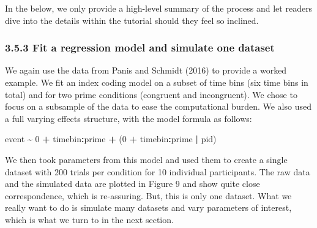 \documentclass[
  man, donotrepeattitle,floatsintext]{apa6}
\newenvironment{Shaded}{\begin{snugshade}}{\end{snugshade}}
\newcommand{\DecValTok}[1]{\textcolor[rgb]{0.00,0.00,0.81}{#1}}
\newcommand{\NormalTok}[1]{#1}
\newcommand{\SpecialCharTok}[1]{\textcolor[rgb]{0.81,0.36,0.00}{\textbf{#1}}}
\begin{document}
In the below, we only provide a high-level summary of the process and let readers dive into the details within the tutorial should they feel so inclined.

\subsubsection{3.5.3 Fit a regression model and simulate one dataset}\label{fit-a-regression-model-and-simulate-one-dataset}

We again use the data from Panis and Schmidt (2016) to provide a worked example.
We fit an index coding model on a subset of time bins (six time bins in total) and for two prime conditions (congruent and incongruent). We chose to focus on a subsample of the data to ease the computational burden. We also used a full varying effects structure, with the model formula as follows:

\begin{Shaded}
\begin{Highlighting}[]
\NormalTok{event }\SpecialCharTok{\textasciitilde{}} \DecValTok{0} \SpecialCharTok{+}\NormalTok{ timebin}\SpecialCharTok{:}\NormalTok{prime }\SpecialCharTok{+}\NormalTok{ (}\DecValTok{0} \SpecialCharTok{+}\NormalTok{ timebin}\SpecialCharTok{:}\NormalTok{prime }\SpecialCharTok{|}\NormalTok{ pid)}
\end{Highlighting}
\end{Shaded}

We then took parameters from this model and used them to create a single dataset with 200 trials per condition for 10 individual participants. The raw data and the simulated data are plotted in Figure 9 and show quite close correspondence, which is re-assuring. But, this is only one dataset. What we really want to do is simulate many datasets and vary parameters of interest, which is what we turn to in the next section.
\end{document}
